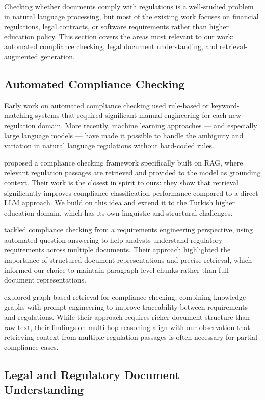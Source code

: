 Checking whether documents comply with regulations is a well-studied problem in natural language processing, but most of the existing work focuses on financial regulations, legal contracts, or software requirements rather than higher education policy. This section covers the areas most relevant to our work: automated compliance checking, legal document understanding, and retrieval-augmented generation.

\subsection{Automated Compliance Checking}

Early work on automated compliance checking used rule-based or keyword-matching systems that required significant manual engineering for each new regulation domain. More recently, machine learning approaches — and especially large language models — have made it possible to handle the ambiguity and variation in natural language regulations without hard-coded rules.

\citet{Sun2025} proposed a compliance checking framework specifically built on RAG, where relevant regulation passages are retrieved and provided to the model as grounding context. Their work is the closest in spirit to ours: they show that retrieval significantly improves compliance classification performance compared to a direct LLM approach. We build on this idea and extend it to the Turkish higher education domain, which has its own linguistic and structural challenges.

\citet{Abualhaija2022} tackled compliance checking from a requirements engineering perspective, using automated question answering to help analysts understand regulatory requirements across multiple documents. Their approach highlighted the importance of structured document representations and precise retrieval, which informed our choice to maintain paragraph-level chunks rather than full-document representations.

\citet{Masoudifard2024} explored graph-based retrieval for compliance checking, combining knowledge graphs with prompt engineering to improve traceability between requirements and regulations. While their approach requires richer document structure than raw text, their findings on multi-hop reasoning align with our observation that retrieving context from multiple regulation passages is often necessary for partial compliance cases.

\subsection{Legal and Regulatory Document Understanding}

